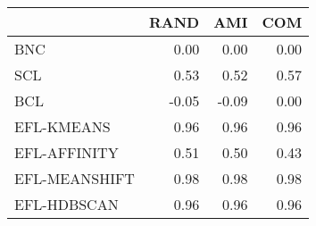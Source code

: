 \begin{tabular}{lrrr}
\toprule
 & RAND & AMI & COM \\
\midrule
BNC & 0.00 & 0.00 & 0.00 \\
SCL & 0.53 & 0.52 & 0.57 \\
BCL & -0.05 & -0.09 & 0.00 \\
EFL-KMEANS & 0.96 & 0.96 & 0.96 \\
EFL-AFFINITY & 0.51 & 0.50 & 0.43 \\
EFL-MEANSHIFT & 0.98 & 0.98 & 0.98 \\
EFL-HDBSCAN & 0.96 & 0.96 & 0.96 \\
\bottomrule
\end{tabular}
